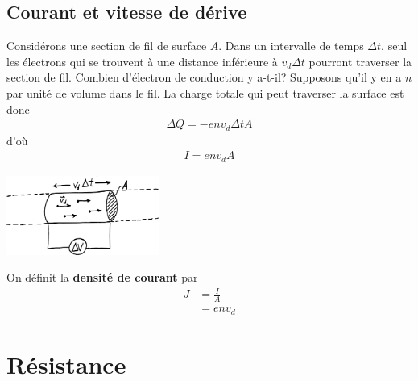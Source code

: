 \subsection*{Courant et vitesse de dérive}

Considérons une section de fil de surface $A$. Dans un intervalle de temps
$\Delta t$, seul les électrons qui se trouvent à une distance inférieure à $v_d
\Delta t$ pourront traverser la section de fil. Combien d'électron de
conduction y a-t-il?
Supposons qu'il y en a $n$ par unité de volume dans le fil. La charge totale
qui peut traverser la surface est donc
\begin{align*}
  \Delta Q = -env_d\Delta t A
\end{align*}
d'où
\begin{align*}
  I = env_d A
\end{align*}

\begin{center}
  \includegraphics[width=5cm]{05-courant-resistance/figures/courant-vd.pdf}
\end{center}

On définit la \textbf{densité de courant} par
\begin{align*}
  J &= \frac{I}{A} \\
    &= env_d
\end{align*}



\section{Résistance}

